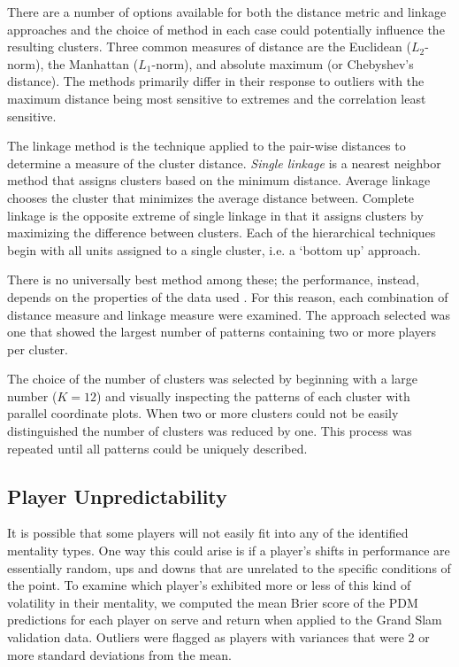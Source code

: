 \documentclass{Latex/svjour3}
\begin{document}
There are a number of options available for both the distance metric and linkage
approaches and the choice of method in each case could potentially influence the
resulting clusters. Three common measures of distance are the Euclidean
($L_2$-norm), the Manhattan ($L_1$-norm), and absolute maximum (or Chebyshev's
distance). The methods primarily differ in their response to outliers with the
maximum distance being most sensitive to extremes and the correlation least
sensitive.

The linkage method is the technique applied to the pair-wise distances to
determine a measure of the cluster distance. \textit{Single linkage} is a
nearest neighbor method that assigns clusters based on the minimum
distance. Average linkage chooses the cluster that minimizes the average
distance between. Complete linkage is the opposite extreme of single linkage in
that it assigns clusters by maximizing the difference between clusters. Each of
the hierarchical techniques begin with all units assigned to a single cluster,
i.e. a `bottom up' approach.

There is no universally best method among these; the performance, instead,
depends on the properties of the data used \cite{kumar2014performance}. For this
reason, each combination of distance measure and linkage measure were
examined. The approach selected was one that showed the largest number of
patterns containing two or more players per cluster.

The choice of the number of clusters was selected by beginning with a large
number ($K = 12$) and visually inspecting the patterns of each cluster with
parallel coordinate plots. When two or more clusters could not be easily
distinguished the number of clusters was reduced by one. This process was
repeated until all patterns could be uniquely described.


\subsection{Player Unpredictability}

It is possible that some players will not easily fit into any of the identified
mentality types. One way this could arise is if a player's shifts in performance
are essentially random, ups and downs that are unrelated to the specific
conditions of the point. To examine which player's exhibited more or less of
this kind of volatility in their mentality, we computed the mean Brier score of
the PDM predictions for each player on serve and return when applied to the
Grand Slam validation data. Outliers were flagged as players with variances that
were 2 or more standard deviations from the mean.
\end{document}

